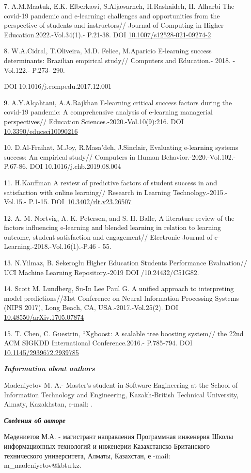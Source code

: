 \begin{references}
7. A.M.Maatuk, E.K. Elberkawi, S.Aljawarneh, H.Rashaideh, H. Alharbi The
covid-19 pandemic and e-learning: challenges and opportunities from the
perspective of students and instructors// Journal of Computing in Higher
Education.2022.-Vol.34(1).- P.21-38. DOI
\href{https://doi.org/10.1007/s12528-021-09274-2}{10.1007/s12528-021-09274-2}

8. W.A.Cidral, T.Oliveira, M.D. Felice, M.Aparicio E-learning success
determinants: Brazilian empirical study// Computers and Education.-
2018. -Vol.122.- P.273- 290.

DOI 10.1016/j.compedu.2017.12.001

9. A.Y.Alqahtani, A.A.Rajkhan E-learning critical success factors during
the covid-19 pandemic: A comprehensive analysis of e-learning managerial
perspectives// Education Sciences.-2020.-Vol.10(9):216. DOI
\href{http://dx.doi.org/10.3390/educsci10090216}{10.3390/educsci10090216}

10. D.Al-Fraihat, M.Joy, R.Masa'deh, J.Sinclair, Evaluating e-learning
systems success: An empirical study// Computers in Human
Behavior.-2020.-Vol.102.-P.67-86. DOI 10.1016/j.chb.2019.08.004

11. H.Kauffman A review of predictive factors of student success in and
satisfaction with online learning// Research in Learning
Technology.-2015.-Vol.15.- P.1-15.
DOI~\href{https://doi.org/10.3402/rlt.v23.26507}{10.3402/rlt.v23.26507}

12. A. M. Nortvig, A. K. Petersen, and S. H. Balle, A literature review
of the factors influencing e-learning and blended learning in relation
to learning outcome, student satisfaction and engagement// Electronic
Journal of e-Learning.-2018.-Vol.16(1).-P.46 - 55.

13. N.Yilmaz, B. Sekeroglu Higher Education Students Performance
Evaluation// UCI Machine Learning Repository.-2019 DOI /10.24432/C51G82.

14. Scott M. Lundberg, Su-In Lee Paul G. A unified approach to
interpreting model predictions//31st Conference on Neural Information
Processing Systems (NIPS 2017), Long Beach, CA, USA.-2017.-Vol.25(2).
DOI
\href{http://dx.doi.org/10.48550/arXiv.1705.07874}{10.48550/arXiv.1705.07874}

15. T. Chen, C. Guestrin, ``Xgboost: A scalable tree boosting system//
the 22nd ACM SIGKDD International Conference.2016.- P.785-794. DOI
\href{http://dx.doi.org/10.1145/2939672.2939785}{10.1145/2939672.2939785}
\end{references}

\begin{authorinfo}
\emph{{\bfseries Information about authors}}

Madeniyetov M. A.- Master's student in Software Engineering at the
School of Information Technology and Engineering, Kazakh-British
Technical University, Almaty, Kazakhstan, e-mail:
\href{mailto:m_madeniyetov@kbtu.kz}{}.

\emph{{\bfseries Сведения об авторе}}

Мәдениетов М.А. - магистрант направления Программная инженерия Школы
информационных технологий и инженерии Казахстанско-Британского
технического университета, Алматы, Казахстан, е -mail:
m\_madeniyetov@kbtu.kz.
\end{authorinfo}

